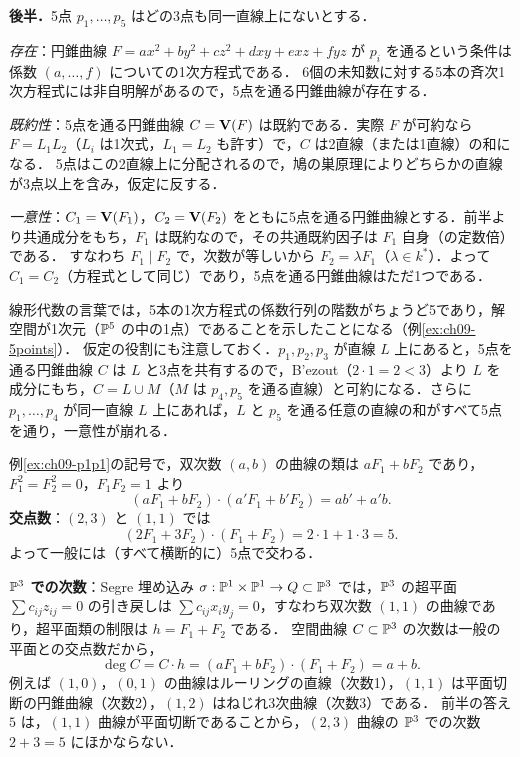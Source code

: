 \textbf{後半．}5点 $p_1,\dots,p_5$ はどの3点も同一直線上にないとする．

\emph{存在}：円錐曲線 $F=ax^2+by^2+cz^2+dxy+exz+fyz$ が $p_i$ を通るという条件は係数 $(a,\dots,f)$ についての1次方程式である．
6個の未知数に対する5本の斉次1次方程式には非自明解があるので，5点を通る円錐曲線が存在する．

\emph{既約性}：5点を通る円錐曲線 $C=\mathbf{V}(F)$ は既約である．実際 $F$ が可約なら $F=L_1L_2$（$L_i$ は1次式，$L_1=L_2$ も許す）で，$C$ は2直線（または1直線）の和になる．
5点はこの2直線上に分配されるので，鳩の巣原理によりどちらかの直線が3点以上を含み，仮定に反する．

\emph{一意性}：$C_1=\mathbf{V}(F_1)$，$C_2=\mathbf{V}(F_2)$ をともに5点を通る円錐曲線とする．前半より共通成分をもち，$F_1$ は既約なので，その共通既約因子は $F_1$ 自身（の定数倍）である．
すなわち $F_1\mid F_2$ で，次数が等しいから $F_2=\lambda F_1$（$\lambda\in k^*$）．よって $C_1=C_2$（方程式として同じ）であり，5点を通る円錐曲線はただ1つである．

線形代数の言葉では，5本の1次方程式の係数行列の階数がちょうど5であり，解空間が1次元（$\mathbb{P}^5$ の中の1点）であることを示したことになる（例\ref{ex:ch09-5points}）．
仮定の役割にも注意しておく．$p_1,p_2,p_3$ が直線 $L$ 上にあると，5点を通る円錐曲線 $C$ は $L$ と3点を共有するので，B'ezout（$2\cdot1=2<3$）より $L$ を成分にもち，$C=L\cup M$（$M$ は $p_4,p_5$ を通る直線）と可約になる．さらに $p_1,\dots,p_4$ が同一直線 $L$ 上にあれば，$L$ と $p_5$ を通る任意の直線の和がすべて5点を通り，一意性が崩れる．

例\ref{ex:ch09-p1p1}の記号で，双次数 $(a,b)$ の曲線の類は $aF_1+bF_2$ であり，$F_1^2=F_2^2=0$，$F_1F_2=1$ より
\[
  (aF_1+bF_2)\cdot(a'F_1+b'F_2)=ab'+a'b .
\]
\textbf{交点数}：$(2,3)$ と $(1,1)$ では
\[
  (2F_1+3F_2)\cdot(F_1+F_2)=2\cdot1+1\cdot3=5 .
\]
よって一般には（すべて横断的に）5点で交わる．

\textbf{$\mathbb{P}^3$ での次数}：Segre 埋め込み $\sigma:\mathbb{P}^1\times\mathbb{P}^1\to Q\subset\mathbb{P}^3$ では，$\mathbb{P}^3$ の超平面 $\sum c_{ij}z_{ij}=0$ の引き戻しは $\sum c_{ij}x_iy_j=0$，すなわち双次数 $(1,1)$ の曲線であり，超平面類の制限は $h=F_1+F_2$ である．
空間曲線 $C\subset\mathbb{P}^3$ の次数は一般の平面との交点数だから，
\[
  \deg C=C\cdot h=(aF_1+bF_2)\cdot(F_1+F_2)=a+b .
\]
例えば $(1,0)$，$(0,1)$ の曲線はルーリングの直線（次数1），$(1,1)$ は平面切断の円錐曲線（次数2），$(1,2)$ はねじれ3次曲線（次数3）である．
前半の答え $5$ は，$(1,1)$ 曲線が平面切断であることから，$(2,3)$ 曲線の $\mathbb{P}^3$ での次数 $2+3=5$ にほかならない．

